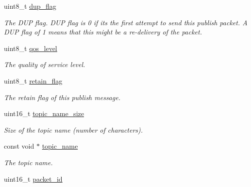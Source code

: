\begin{DoxyCompactItemize}
\item 
uint8\+\_\+t \hyperlink{structmqtt__response__publish_aff09bd16179b085e8452f4bd7fe3c88c}{dup\+\_\+flag}\hypertarget{structmqtt__response__publish_aff09bd16179b085e8452f4bd7fe3c88c}{}\label{structmqtt__response__publish_aff09bd16179b085e8452f4bd7fe3c88c}

\begin{DoxyCompactList}\small\item\em The D\+UP flag. D\+UP flag is 0 if its the first attempt to send this publish packet. A D\+UP flag of 1 means that this might be a re-\/delivery of the packet. \end{DoxyCompactList}\item 
uint8\+\_\+t \hyperlink{structmqtt__response__publish_ab6bc13774afcff002ce4f9afbee05493}{qos\+\_\+level}
\begin{DoxyCompactList}\small\item\em The quality of service level. \end{DoxyCompactList}\item 
uint8\+\_\+t \hyperlink{structmqtt__response__publish_aba854fcc4effcc95ba3e7ec597a4d7ca}{retain\+\_\+flag}\hypertarget{structmqtt__response__publish_aba854fcc4effcc95ba3e7ec597a4d7ca}{}\label{structmqtt__response__publish_aba854fcc4effcc95ba3e7ec597a4d7ca}

\begin{DoxyCompactList}\small\item\em The retain flag of this publish message. \end{DoxyCompactList}\item 
uint16\+\_\+t \hyperlink{structmqtt__response__publish_aba0470673fc54d85da3d94228a05f8a3}{topic\+\_\+name\+\_\+size}\hypertarget{structmqtt__response__publish_aba0470673fc54d85da3d94228a05f8a3}{}\label{structmqtt__response__publish_aba0470673fc54d85da3d94228a05f8a3}

\begin{DoxyCompactList}\small\item\em Size of the topic name (number of characters). \end{DoxyCompactList}\item 
const void $\ast$ \hyperlink{structmqtt__response__publish_a5f35698c457c51f8099ff1d8f4198403}{topic\+\_\+name}
\begin{DoxyCompactList}\small\item\em The topic name. \end{DoxyCompactList}\item 
uint16\+\_\+t \hyperlink{structmqtt__response__publish_a7852df5d850a832ccc441b87cf9d8d03}{packet\+\_\+id}\hypertarget{structmqtt__response__publish_a7852df5d850a832ccc441b87cf9d8d03}{}\label{structmqtt__response__publish_a7852df5d850a832ccc441b87cf9d8d03}


\end{DoxyCompactItemize}

